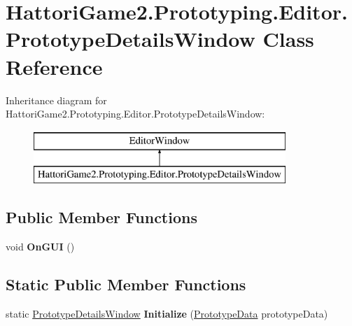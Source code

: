 \hypertarget{class_hattori_game2_1_1_prototyping_1_1_editor_1_1_prototype_details_window}{}\section{Hattori\+Game2.\+Prototyping.\+Editor.\+Prototype\+Details\+Window Class Reference}
\label{class_hattori_game2_1_1_prototyping_1_1_editor_1_1_prototype_details_window}
Inheritance diagram for Hattori\+Game2.\+Prototyping.\+Editor.\+Prototype\+Details\+Window\+:\begin{figure}[H]
\begin{center}
\leavevmode
\includegraphics[height=2.000000cm]{class_hattori_game2_1_1_prototyping_1_1_editor_1_1_prototype_details_window}
\end{center}
\end{figure}
\subsection*{Public Member Functions}
\begin{DoxyCompactItemize}
\item 
\hypertarget{class_hattori_game2_1_1_prototyping_1_1_editor_1_1_prototype_details_window_ad8db77b3db83d706e54cb47c71292cd2}{}void {\bfseries On\+G\+U\+I} ()\label{class_hattori_game2_1_1_prototyping_1_1_editor_1_1_prototype_details_window_ad8db77b3db83d706e54cb47c71292cd2}

\end{DoxyCompactItemize}
\subsection*{Static Public Member Functions}
\begin{DoxyCompactItemize}
\item 
\hypertarget{class_hattori_game2_1_1_prototyping_1_1_editor_1_1_prototype_details_window_a0abc4956958aae3989090ba1e16f0295}{}static \hyperlink{class_hattori_game2_1_1_prototyping_1_1_editor_1_1_prototype_details_window}{Prototype\+Details\+Window} {\bfseries Initialize} (\hyperlink{class_hattori_game2_1_1_prototyping_1_1_prototype_data}{Prototype\+Data} prototype\+Data)\label{class_hattori_game2_1_1_prototyping_1_1_editor_1_1_prototype_details_window_a0abc4956958aae3989090ba1e16f0295}

\end{DoxyCompactItemize}
